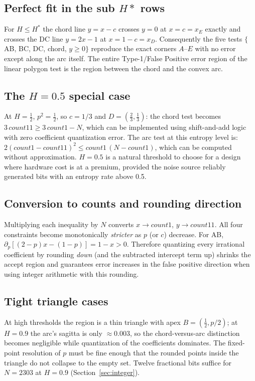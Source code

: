 \documentclass[11pt]{article}
\begin{document}
\subsection{Perfect fit in the sub $H\ast$ rows}
For $H\le H^\ast$ the chord line $y=x-c$ crosses $y=0$ at $x=c=x_E$ exactly
and crosses the DC line $y=2x-1$ at $x=1-c=x_D$. Consequently the
five tests $\{$AB, BC, DC, chord, $y\ge0\}$ reproduce the exact corners
$A$--$E$ with no error except along the arc itself. The entire
Type-1/False Positive error region of the linear polygon test is the
region between the chord and the convex arc.

\subsection{The \texorpdfstring{$H=0.5$}{H=0.5} special case}
At $H=\tfrac12$, $p^2=\tfrac12$, so $c=1/3$ and $D=(\tfrac23,\tfrac13)$:
the chord test becomes $3\,\mathit{count11} \ge 3\,\mathit{count1} - N$,
which can be implemented using shift-and-add logic with zero coefficient
quantization error. The  arc test at this entropy level is:
$2(\mathit{count1}-\mathit{count11})^2 \le \mathit{count1}\,(N-\mathit{count1})$,
which can be computed without approximation. $H=0.5$ is a natural threshold
to choose for a design where hardware cost is at a premium, provided the
noise source reliably generated bits with an entropy rate above 0.5.

\subsection{Conversion to counts and rounding direction}
Multiplying each inequality by $N$ converts $x\to\mathit{count1}$,
$y\to\mathit{count11}$. All four constraints become monotonically
\emph{stricter} as $p$ (or $c$) decrease. For AB,
$\partial_p[(2-p)x-(1-p)] = 1-x > 0$.
Therefore quantizing every irrational coefficient by rounding \emph{down}
(and the subtracted intercept term up) shrinks the accept region and
guarantees error increases in the false positive direction when using
integer arithmetic with this rounding.

\subsection{Tight triangle cases}
At high thresholds the region is a thin triangle with apex
$B=(\tfrac12,p/2)$; at $H=0.9$ the arc's sagitta is only ${\approx}0.003$, so
the chord-versus-arc distinction becomes negligible while
quantization of the coefficients dominates. The fixed-point resolution of $p$ must
be fine enough
that the rounded points inside the triangle do not collapse to the empty set. Twelve
fractional bits suffice for $N=2303$ at $H=0.9$ (Section~\ref{sec:integer}).
\end{document}
